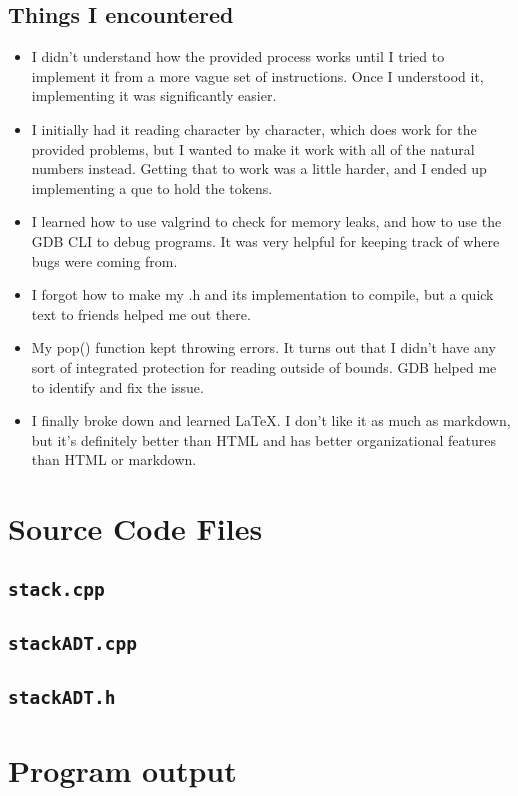 \documentclass{article}
\begin{document}
    \subsection{Things I encountered}
    \begin{itemize}
        \item I didn't understand how the provided process works until I tried to implement it from a more vague set of instructions. Once I understood it, implementing it was significantly easier.
        \item I initially had it reading character by character, which does work for the provided problems, but I wanted to make it work with all of the natural numbers instead. Getting that to work was a little harder, and I ended up implementing a que to hold the tokens.
        \item I learned how to use valgrind to check for memory leaks, and how to use the GDB CLI to debug programs. It was very helpful for keeping track of where bugs were coming from.
        \item I forgot how to make my .h and its implementation to compile, but a quick text to friends helped me out there.
        \item My pop() function kept throwing errors. It turns out that I didn't have any sort of integrated protection for reading outside of bounds. GDB helped me to identify and fix the issue.
        \item I finally broke down and learned LaTeX. I don't like it as much as markdown, but it's definitely better than HTML and has better organizational features than HTML or markdown.
    \end{itemize}
    
\newpage

\section{Source Code Files}
    \subsection{\texttt{stack.cpp}}
        
        \newpage
    \subsection{\texttt{stackADT.cpp}}
        
        \newpage
    \subsection{\texttt{stackADT.h}}
        
        \newpage

    
\section{Program output}
    
\end{document}
